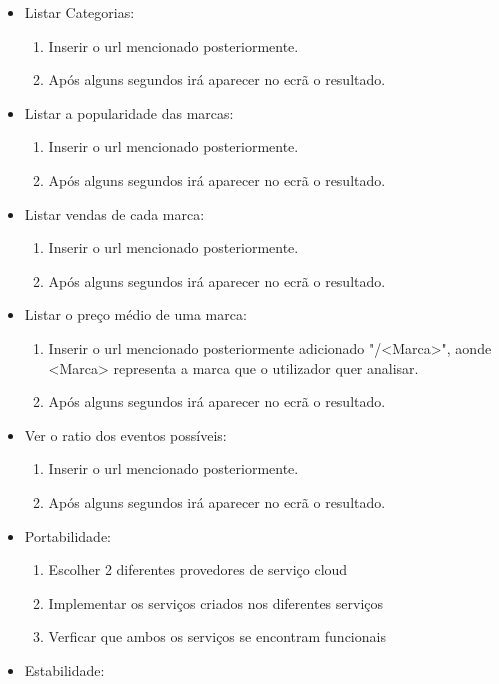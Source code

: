 \documentclass[11pt,a4paper]{article}
\begin{document}
\begin{itemize}
	\item Listar Categorias:
	\begin{enumerate}
		\item Inserir o url mencionado posteriormente.
		\item Após alguns segundos irá aparecer no ecrã o resultado.
	\end{enumerate}
	\item Listar a popularidade das marcas:
	\begin{enumerate}
		\item Inserir o url mencionado posteriormente.
		\item Após alguns segundos irá aparecer no ecrã o resultado.
	\end{enumerate}
	\item Listar vendas de cada marca:
	\begin{enumerate}
		\item Inserir o url mencionado posteriormente.
		\item Após alguns segundos irá aparecer no ecrã o resultado.
	\end{enumerate}
	\item Listar o preço médio de uma marca:
	\begin{enumerate}
		\item Inserir o url mencionado posteriormente adicionado "/<Marca>", aonde <Marca> representa a marca que o utilizador quer analisar.
		\item Após alguns segundos irá aparecer no ecrã o resultado.
	\end{enumerate}
	\item Ver o ratio dos eventos possíveis:
	\begin{enumerate}
		\item Inserir o url mencionado posteriormente.
		\item Após alguns segundos irá aparecer no ecrã o resultado.
	\end{enumerate}
	\item Portabilidade:
	\begin{enumerate}
		\item Escolher 2 diferentes provedores de serviço cloud
		\item Implementar os serviços criados nos diferentes serviços
		\item Verficar que ambos os serviços se encontram funcionais
	\end{enumerate}
	\item Estabilidade:

\end{itemize}
\end{document}
